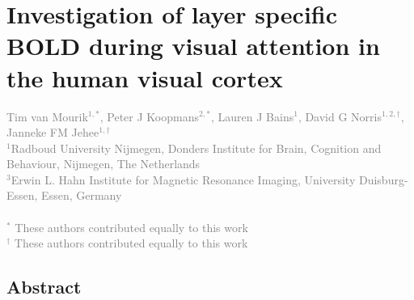 
\chapter{Investigation of layer specific BOLD during visual attention in the human visual cortex}
\label{ch:attention}

\textcolor{gray}{{Tim van Mourik$^{1,*}$}, Peter J Koopmans$^{2,*}$, Lauren J Bains$^{1}$, David G Norris$^{1,2,\dagger}$, Janneke FM Jehee$^{1,\dagger}$\\
$^{1}$Radboud University Nijmegen, Donders Institute for Brain, Cognition and Behaviour, Nijmegen, The Netherlands \\
$^{3}$Erwin L. Hahn Institute for Magnetic Resonance Imaging, University Duisburg-Essen, Essen, Germany\\
\\
$^*$ 		{These authors contributed equally to this work} 
\\
$^\dagger$  {These authors contributed equally to this work}
}

\newpage
\section*{Abstract}

\newpage








